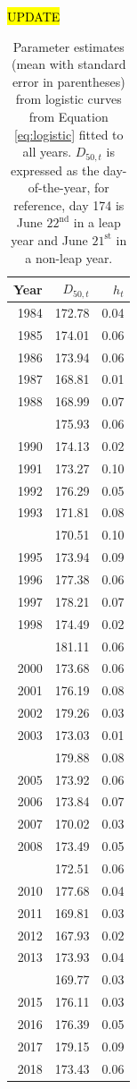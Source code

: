 \documentclass[12pt,]{book}
\theoremstyle{definition}
\theoremstyle{definition}
\theoremstyle{definition}
\theoremstyle{remark}
\begin{document}
\begin{singlespace}

\hl{UPDATE}

\begin{table}

\caption{\label{tab:rt-ests-table}Parameter estimates (mean with standard error in parentheses) from logistic curves from Equation \ref{eq:logistic} fitted to all years. $D_{50,t}$ is expressed as the day-of-the-year, for reference, day 174 is June $22^{\text{nd}}$ in a leap year and June $21^{\text{st}}$ in a non-leap year.}
\centering
\begin{tabular}[t]{rrr}
\toprule
Year & $D_{50,t}$ & $h_t$\\
\midrule
1984 & 172.78 & 0.04\\
1985 & 174.01 & 0.06\\
1986 & 173.94 & 0.06\\
1987 & 168.81 & 0.01\\
1988 & 168.99 & 0.07\\
\addlinespace
1989 & 175.93 & 0.06\\
1990 & 174.13 & 0.02\\
1991 & 173.27 & 0.10\\
1992 & 176.29 & 0.05\\
1993 & 171.81 & 0.08\\
\addlinespace
1994 & 170.51 & 0.10\\
1995 & 173.94 & 0.09\\
1996 & 177.38 & 0.06\\
1997 & 178.21 & 0.07\\
1998 & 174.49 & 0.02\\
\addlinespace
1999 & 181.11 & 0.06\\
2000 & 173.68 & 0.06\\
2001 & 176.19 & 0.08\\
2002 & 179.26 & 0.03\\
2003 & 173.03 & 0.01\\
\addlinespace
2004 & 179.88 & 0.08\\
2005 & 173.92 & 0.06\\
2006 & 173.84 & 0.07\\
2007 & 170.02 & 0.03\\
2008 & 173.49 & 0.05\\
\addlinespace
2009 & 172.51 & 0.06\\
2010 & 177.68 & 0.04\\
2011 & 169.81 & 0.03\\
2012 & 167.93 & 0.02\\
2013 & 173.93 & 0.04\\
\addlinespace
2014 & 169.77 & 0.03\\
2015 & 176.11 & 0.03\\
2016 & 176.39 & 0.05\\
2017 & 179.15 & 0.09\\
2018 & 173.43 & 0.06\\
\bottomrule
\end{tabular}
\end{table}

\end{singlespace}
\end{document}
